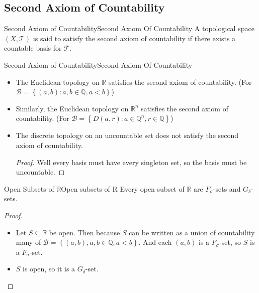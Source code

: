 \documentclass[../main.tex]{subfiles}
\begin{document}
\subsection{Second Axiom of Countability}
\begin{definition}{Second Axiom of Countability}{Second Axiom Of Countability}
A topological space $(X,\mathcal{T})$ is said to satisfy the second axiom of countability if there exists a countable basis for $\mathcal{T}$.
\end{definition}

\begin{example}{Second Axiom of Countability}{Second Axiom Of Countability}
\begin{itemize}
\item The Euclidean topology on $\mathbb{R}$ satisfies the second axiom of countability. (For $\mathcal{B} = \left\{ (a,b): a,b\in \mathbb{Q}, a<b \right\}$)
\item Similarly, the Euclidean topology on $\mathbb{R}^n$ satisfies the second axiom of countability. (For $\mathcal{B} = \left\{ D(a,r): a\in \mathbb{Q}^n, r\in \mathbb{Q} \right\}$)
\item The discrete topology on an uncountable set does not satisfy the second axiom of countability.
	\begin{proof}
	Well every basis must have every singleton set, so the basis must be uncountable.
	\end{proof}
\end{itemize}
\end{example}


\begin{proposition}{Open Subsets of $\mathbb{R}$}{Open subsets of R}
Every open subset of $\mathbb{R}$ are $F_{\sigma}$-sets and $G_{\delta}$-sets.
\end{proposition}
\begin{proof}
\begin{itemize}
	\item Let $S\subseteq \mathbb{R}$ be open. Then because $S$ can be written as a union of countability many of $\mathcal{B} = \left\{ (a,b), a,b\in \mathbb{Q},a<b \right\}$. And each $(a,b)$ is a $F_{\sigma}$-set, so $S$ is a $F_{\sigma}$-set.
	\item $S$ is open, so it is a $G_{\delta}$-set.
\end{itemize}
\end{proof}
\end{document}

